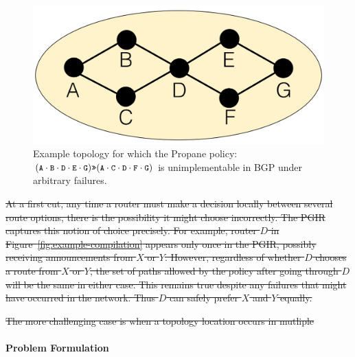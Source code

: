 \documentclass[10pt]{sigalternate052015} %
\newcommand{\sysname}{{\small \sf Propane}\xspace}
\newcommand{\para}[1]{\paragraph*{\textbf{#1}}}
\newcommand{\CD}[1]{\texttt{\small #1}}  %
\newcommand{\Prefer}{\texttt{>>}}
\providecommand{\DIFdel}[1]{{\protect\color{red}\sout{#1}}}                      %
\providecommand{\DIFaddbegin}{} %
\providecommand{\DIFaddend}{} %
\providecommand{\DIFdelbegin}{} %
\providecommand{\DIFdelend}{} %
\begin{document}
\DIFaddbegin \begin{figure}[t!]
  \centering
  \includegraphics[width=.8\columnwidth]{figures/unimplementable}
  \caption{Example topology for which the \sysname policy: $(\CD{A} \cdot \CD{B} \cdot \CD{D} \cdot \CD{E} \cdot \CD{G}) \Prefer (\CD{A} \cdot \CD{C} \cdot \CD{D} \cdot \CD{F} \cdot \CD{G})$ is unimplementable in BGP under arbitrary failures.}
  \label{fig:unimplementable}
\end{figure}
\DIFaddend 


\DIFdelbegin \DIFdel{At a first cut, any time a router must make a decision locally between several route options, there is the possibility it might choose incorrectly. The PGIR captures this notion of choice precisely. For example, router $D$ in Figure~\ref{fig:example-compilation} appears only once in the PGIR, possibly receiving announcements from $X$ or $Y$. However, regardless of whether $D$ chooses a route from $X$ or $Y$, the set of paths allowed by the policy after going through $D$ will be the same in either case. This remains true despite any failures that might have occurred in the network. Thus $D$ can safely prefer $X$ and $Y$ equally.
}%

\DIFdel{The more challenging case is when a topology location occurs in mutliple }\DIFdelend \DIFaddbegin \para{Problem Formulation}
\end{document}
